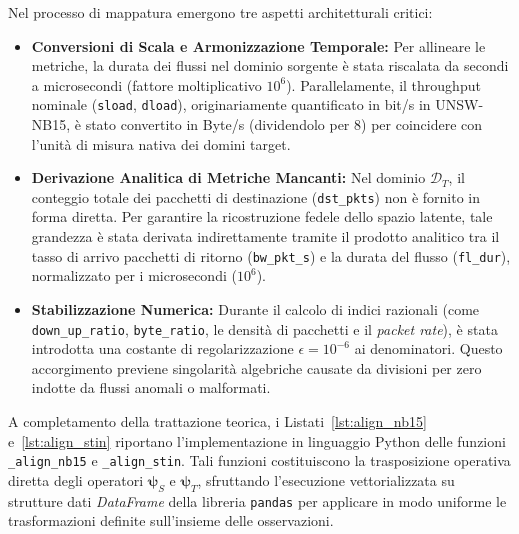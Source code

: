 Nel processo di mappatura emergono tre aspetti architetturali critici:
\begin{itemize}
    \item \textbf{Conversioni di Scala e Armonizzazione Temporale:} Per allineare le metriche, la durata dei flussi nel dominio sorgente è stata riscalata da secondi a microsecondi (fattore moltiplicativo $10^6$). Parallelamente, il throughput nominale (\texttt{sload}, \texttt{dload}), originariamente quantificato in bit/s in UNSW-NB15, è stato convertito in Byte/s (dividendolo per 8) per coincidere con l'unità di misura nativa dei domini target.
    \item \textbf{Derivazione Analitica di Metriche Mancanti:} Nel dominio $\mathcal{D}_T$, il conteggio totale dei pacchetti di destinazione (\texttt{dst\_pkts}) non è fornito in forma diretta. Per garantire la ricostruzione fedele dello spazio latente, tale grandezza è stata derivata indirettamente tramite il prodotto analitico tra il tasso di arrivo pacchetti di ritorno (\texttt{bw\_pkt\_s}) e la durata del flusso (\texttt{fl\_dur}), normalizzato per i microsecondi ($10^6$).
    \item \textbf{Stabilizzazione Numerica:} Durante il calcolo di indici razionali (come \texttt{down\_up\_ratio}, \texttt{byte\_ratio}, le densità di pacchetti e il \textit{packet rate}), è stata introdotta una costante di regolarizzazione $\epsilon = 10^{-6}$ ai denominatori. Questo accorgimento previene singolarità algebriche causate da divisioni per zero indotte da flussi anomali o malformati.
\end{itemize}

A completamento della trattazione teorica, i Listati~\ref{lst:align_nb15} e~\ref{lst:align_stin} riportano l'implementazione in linguaggio Python delle funzioni \texttt{\_align\_nb15} e \texttt{\_align\_stin}.
Tali funzioni costituiscono la trasposizione operativa diretta degli operatori $\boldsymbol{\psi}_S$ e $\boldsymbol{\psi}_T$, sfruttando l'esecuzione vettorializzata su strutture dati \textit{DataFrame} della libreria \texttt{pandas} per applicare in modo uniforme le trasformazioni definite sull'insieme delle osservazioni.

\newpage

